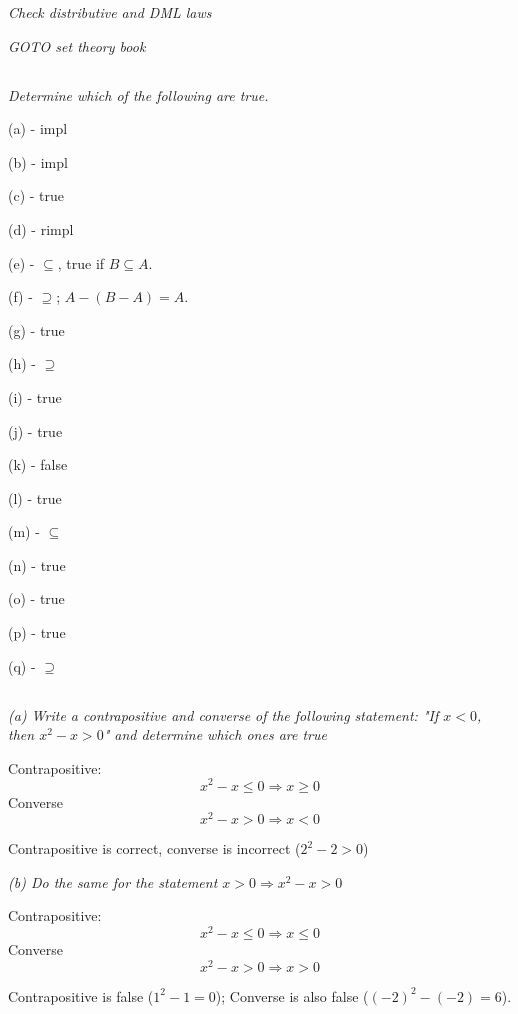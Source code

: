 \documentclass[11pt,oneside,titlepage]{book}
\DeclareMathOperator \ra {\Rightarrow}
\begin{document}
\textit{Check distributive and DML laws}

\textit{GOTO set theory book}

\subsection{}

\textit{Determine which of the following are true.}

(a) - impl

(b) - impl

(c) - true

(d) - rimpl

(e) - $\subseteq$, true if $B \subseteq A$.

(f) - $\supseteq$;   $A - (B - A) = A$.

(g) - true

(h) - $\supseteq$

(i) - true

(j) - true

(k) - false

(l) - true

(m) - $\subseteq$

(n) - true

(o) - true

(p) - true

(q) - $\supseteq$

\subsection{}

\textit{(a) Write a contrapositive and converse of the following statement:
  "If $x < 0$, then $x^2 - x > 0$" and determine which ones are true}

Contrapositive:
$$x^2 - x \leq 0 \ra x \geq 0$$
Converse
$$x^2 - x > 0 \ra x < 0$$

Contrapositive is correct, converse is incorrect ($2^2 - 2 > 0$)

\textit{(b) Do the same for the statement $x > 0 \ra x^2 - x > 0$}

Contrapositive:
$$x^2 - x \leq 0 \ra x \leq 0$$
Converse
$$ x^2 - x > 0 \ra x > 0 $$

Contrapositive is false ($1^2 - 1 = 0$); Converse is also false ($(-2)^2 - (-2) = 6$).

\subsection{}
\end{document}
